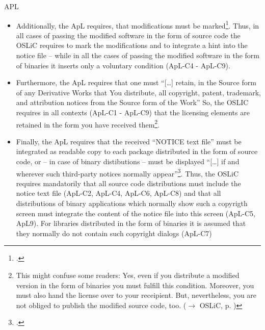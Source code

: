 \begin{license}{APL}
\begin{itemize}
  \item Additionally, the ApL requires, that modifications must be
  marked\footcite[cf.][\nopage wp.\ §4.2]{Apl20OsiLicense2004a}. Thus, in all
  cases of passing the modified software in the form of source code the OSLiC
  requires to mark the modifications and to integrate a hint into the notice
  file – while in all the cases of passing the modified software in the form of
  binaries it inserts only a voluntary condition (ApL-C4 - ApL-C9).
  
  \item Furthermore, the ApL requires that one must \enquote{[\ldots] retain, in
  the Source form of any Derivative Works that You distribute, all copyright,
  patent, trademark, and attribution notices from the Source form of the Work}
  So, the OSLIC requires in all contexts (ApL-C1 - ApL-C9) that the licensing
  elements are retained in the form you have received them\footnote{This might
  confuse some readers: Yes, even if you distribute a modified version in the
  form of binaries you must fulfill this condition. Moreover, you must also hand
  the license over to your receipient. But, nevertheless, you are not obliged to
  publish the modified source code, too. ($\rightarrow$ OSLiC, p.
  )}.
  
  \item Finally, the ApL requires that the received “NOTICE text file” must be
  integrated as readable copy to each package distributed in the form of source
  code, or – in case of binary distibutions – must be displayed
  \enquote{[\ldots] if and wherever such third-party notices normally
  appear}\footcite[cf.][\nopage wp.\ §4.4]{Apl20OsiLicense2004a}. Thus, the OSLiC
  requires mandatorily that all source code distributions must include the
  notice text file (ApL-C2, ApL-C4, ApL-C6, ApL-C8) and that all distributions of
  binary applications which normally show such a copyrigth screen must integrate
  the content of the notice file into this screen (ApL-C5, ApL9). For libraries
  distributed in the form of binaries it is assumed that they normally do not
  contain such copyright dialogs (ApL-C7)
\end{itemize}

\end{license}

%

